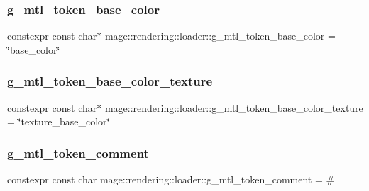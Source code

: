 \hypertarget{namespacemage_1_1rendering_1_1loader_a3734365e774517fec742e798d45e4c63}{}\label{namespacemage_1_1rendering_1_1loader_a3734365e774517fec742e798d45e4c63} 
\subsubsection{\texorpdfstring{g\+\_\+mtl\+\_\+token\+\_\+base\+\_\+color}{g\_mtl\_token\_base\_color}}
{\footnotesize\ttfamily constexpr const char$\ast$ mage\+::rendering\+::loader\+::g\+\_\+mtl\+\_\+token\+\_\+base\+\_\+color = \char`\"{}base\+\_\+color\char`\"{}}

\hypertarget{namespacemage_1_1rendering_1_1loader_a9e00302669eed778925141669bb55cc1}{}\label{namespacemage_1_1rendering_1_1loader_a9e00302669eed778925141669bb55cc1} 
\subsubsection{\texorpdfstring{g\+\_\+mtl\+\_\+token\+\_\+base\+\_\+color\+\_\+texture}{g\_mtl\_token\_base\_color\_texture}}
{\footnotesize\ttfamily constexpr const char$\ast$ mage\+::rendering\+::loader\+::g\+\_\+mtl\+\_\+token\+\_\+base\+\_\+color\+\_\+texture = \char`\"{}texture\+\_\+base\+\_\+color\char`\"{}}

\hypertarget{namespacemage_1_1rendering_1_1loader_aa434371c99d44cc729773cec213def03}{}\label{namespacemage_1_1rendering_1_1loader_aa434371c99d44cc729773cec213def03} 
\subsubsection{\texorpdfstring{g\+\_\+mtl\+\_\+token\+\_\+comment}{g\_mtl\_token\_comment}}
{\footnotesize\ttfamily constexpr const char mage\+::rendering\+::loader\+::g\+\_\+mtl\+\_\+token\+\_\+comment = \textquotesingle{}\#\textquotesingle{}}

